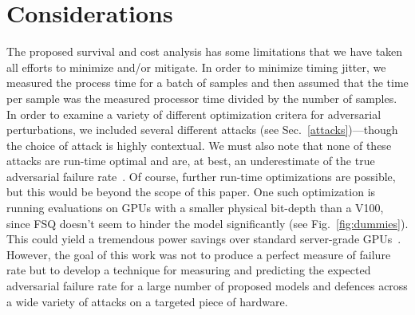 \section{Considerations}
The proposed survival and cost analysis  has some limitations that we have taken all efforts to minimize and/or mitigate. In order to minimize timing jitter, we measured the process time for a batch of samples and then assumed that the time per sample was the measured processor time divided by the number of samples. In order to examine a variety of different optimization critera for adversarial perturbations, we included several different attacks (see Sec.~\ref{attacks})---though the choice of attack is highly contextual. We must also note that none of these attacks are run-time optimal and are, at best, an underestimate of the true adversarial failure rate~\citep{meyers}. Of course, further run-time optimizations are possible, but this would be beyond the scope of this paper.
One such optimization is running evaluations on GPUs with a smaller physical bit-depth than a V100, since FSQ doesn't seem to hinder the model significantly (see Fig.~\ref{fig:dummies}). This could yield a tremendous power savings over standard server-grade GPUs~\citep{chou2023applicability}.
However, the goal of this work was not to produce a perfect measure of failure rate but to develop a technique for measuring and predicting the expected adversarial failure rate for a large number of proposed models and defences across a wide variety of attacks on a targeted piece of hardware.

